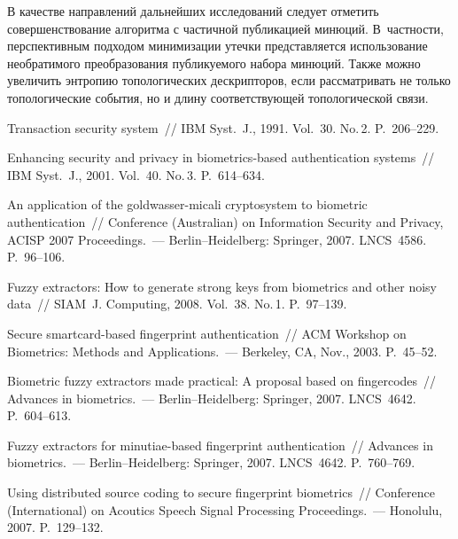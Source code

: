 \begin{multicols}{2}
      В качестве направлений дальнейших исследований следует отметить 
совершенствование алгоритма с частичной публикацией минюций. В~част\-ности, 
перспективным подходом минимизации утечки представляется использование 
необратимого преобразования публикуемого набора минюций. Также можно увеличить 
энтропию топологических дескрипторов, если рассматривать не только топологические 
события, но и длину соответствующей топологической связи. 

{\small\frenchspacing
{%
\begin{thebibliography}{99}
      
Transaction security system~// IBM Syst.~J., 1991. Vol.~30. No.\,2. P.~206--229.

Enhancing security and privacy in biometrics-based authentication systems~// IBM Syst.~J., 
2001. Vol.~40. No.\,3. P.~614--634.

An application of the goldwasser-micali cryptosystem to biometric authentication~// 
Conference (Australian) on Information Security and Privacy, ACISP 2007
Proceedings.~--- Berlin--Heidelberg: Springer,  2007. LNCS~4586. P.~96--106. 

Fuzzy extractors: How to generate strong keys from biometrics and other noisy data~// SIAM~J. 
Computing, 2008. Vol.~38. No.\,1. P.~97--139. 

Secure smartcard-based fingerprint authentication~// ACM Workshop on Biometrics: Methods 
and Applications.~--- Berkeley, CA, Nov., 2003. P.~45--52.


Biometric fuzzy extractors made practical: A proposal based on fingercodes~// Advances in 
biometrics.~--- Berlin--Heidelberg: Springer, 2007. LNCS~4642. P.~604--613.

Fuzzy extractors for minutiae-based fingerprint authentication~// Advances in biometrics.~--- 
Berlin--Heidelberg: Springer, 2007. LNCS~4642. P.~760--769.

Using distributed source coding to secure fingerprint biometrics~//  Conference (International)
on  Acoutics Speech Signal Processing Proceedings.~--- Honolulu, 2007. P.~129--132.


\end{thebibliography}}}
\end{multicols}
